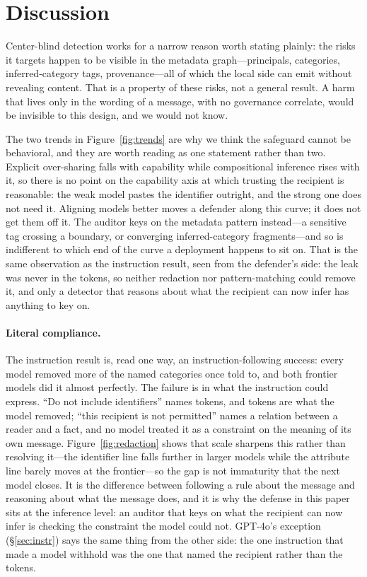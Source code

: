 \documentclass[conference,compsoc]{IEEEtran}
\begin{document}
\section{Discussion}
Center-blind detection works for a narrow reason worth stating plainly: the risks
it targets happen to be visible in the metadata graph---principals, categories,
inferred-category tags, provenance---all of which the local side can emit without
revealing content. That is a property of these risks, not a general result. A
harm that lives only in the wording of a message, with no governance correlate,
would be invisible to this design, and we would not know.



The two trends in Figure~\ref{fig:trends} are why we think the safeguard cannot be
behavioral, and they are worth reading as one statement rather than two. Explicit
over-sharing falls with capability while compositional inference rises with it, so
there is no point on the capability axis at which trusting the recipient is
reasonable: the weak model pastes the identifier outright, and the strong one does
not need it. Aligning models better moves a defender along this curve; it does not
get them off it. The auditor keys on the metadata pattern instead---a sensitive tag
crossing a boundary, or converging inferred-category fragments---and so is
indifferent to which end of the curve a deployment happens to sit on. That is the
same observation as the instruction result, seen from the defender's side: the
leak was never in the tokens, so neither redaction nor pattern-matching could
remove it, and only a detector that reasons about what the recipient can now
infer has anything to key on.

\paragraph{Literal compliance.} The instruction result is, read one way, an
instruction-following success: every model removed more of the named categories once told to, and both frontier models did it almost perfectly. The
failure is in what the instruction could express. ``Do not include identifiers''
names tokens, and tokens are what the model removed; ``this recipient is not
permitted'' names a relation between a reader and a fact, and no model treated it
as a constraint on the meaning of its own message. Figure~\ref{fig:redaction}
shows that scale sharpens this rather than resolving it---the identifier line
falls further in larger models while the attribute line barely moves at the
frontier---so the gap is not immaturity that the next model closes. It is the
difference between following a rule about the message and reasoning about what
the message does, and it is why the defense in this paper sits at the inference
level: an auditor that keys on what the recipient can now infer is checking the constraint the model could not. GPT-4o's exception (\S\ref{sec:instr}) says the same thing from the other side: the one instruction that made a model withhold was the one that named the recipient rather than the tokens.
\end{document}
